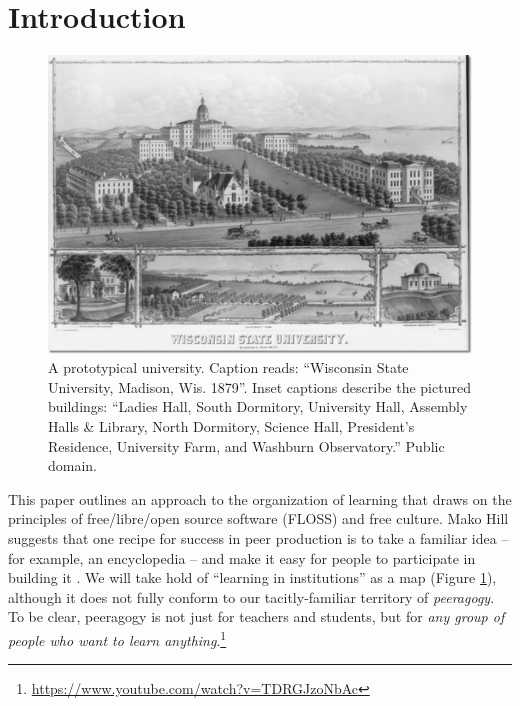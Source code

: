
\section*{Introduction}\label{sec:Introduction}

\begin{figure}
\vspace{-1.05cm}
\begin{center}
\includegraphics[width=.5\textwidth,trim=0 30 10 2, clip=true]{wisconsin-map}
\end{center}
\vspace{-.5cm}
\caption{A prototypical university.  Caption reads: ``Wisconsin State
  University, Madison, Wis. 1879''.  Inset captions describe
  the pictured buildings: ``Ladies Hall, South Dormitory, University
  Hall, Assembly Halls \& Library, North Dormitory, Science Hall,
  President's Residence, University Farm, and Washburn Observatory.'' Public
  domain.\label{madison-map}}
\vspace{-.9cm}
\end{figure}

This paper  outlines an approach to the organization of learning that draws on the principles of free\slash libre\slash open source software (FLOSS) and free culture.
 Mako Hill suggests that one recipe for success in peer production is to take a familiar idea -- for example, an encyclopedia -- and make it easy for people to participate in building it \cite[Chapter 1]{mako-thesis}.  We will take hold of ``learning in institutions'' as a map (Figure \ref{madison-map}), although it does not fully conform to our tacitly-familiar territory of \emph{peeragogy}.  To be clear, peeragogy is not just for teachers and students, but for \emph{any group of people who want to learn anything}.\footnote{\url{https://www.youtube.com/watch?v=TDRGJzoNbAc}}


